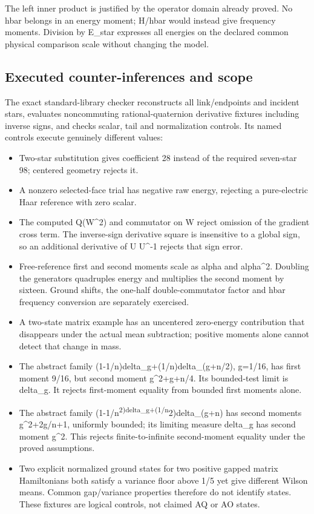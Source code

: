 The left inner product is justified by the operator domain already proved. No hbar belongs in an energy moment; H/hbar would instead give frequency moments. Division by E\_star expresses all energies on the declared common physical comparison scale without changing the model.

\hypertarget{r30-at1-reverse-executed-counter-inferences-and-scope}{%
\subsection{Executed counter-inferences and scope}\label{r30:at1:reverse:r30-at1-reverse-executed-counter-inferences-and-scope}}

The exact standard-library checker reconstructs all link/endpoints and incident stars, evaluates noncommuting rational-quaternion derivative fixtures including inverse signs, and checks scalar, tail and normalization controls. Its named controls execute genuinely different values:

\begin{itemize}
\tightlist
\item
  Two-star substitution gives coefficient 28 instead of the required seven-star 98; centered geometry rejects it.
\item
  A nonzero selected-face trial has negative raw energy, rejecting a pure-electric Haar reference with zero scalar.
\item
  The computed Q(W\^{}2) and commutator on W reject omission of the gradient cross term. The inverse-sign derivative square is insensitive to a global sign, so an additional derivative of U U\^{}-1 rejects that sign error.
\item
  Free-reference first and second moments scale as alpha and alpha\^{}2. Doubling the generators quadruples energy and multiplies the second moment by sixteen. Ground shifts, the one-half double-commutator factor and hbar frequency conversion are separately exercised.
\item
  A two-state matrix example has an uncentered zero-energy contribution that disappears under the actual mean subtraction; positive moments alone cannot detect that change in mass.
\item
  The abstract family (1-1/n)delta\_g+(1/n)delta\_(g+n/2), g=1/16, has first moment 9/16, but second moment g\^{}2+g+n/4. Its bounded-test limit is delta\_g. It rejects first-moment equality from bounded first moments alone.
\item
  The abstract family (1-1/n\textsuperscript{2)delta\_g+(1/n}2)delta\_(g+n) has second moments g\^{}2+2g/n+1, uniformly bounded; its limiting measure delta\_g has second moment g\^{}2. This rejects finite-to-infinite second-moment equality under the proved assumptions.
\item
  Two explicit normalized ground states for two positive gapped matrix Hamiltonians both satisfy a variance floor above 1/5 yet give different Wilson means. Common gap/variance properties therefore do not identify states. These fixtures are logical controls, not claimed AQ or AO states.
\end{itemize}

